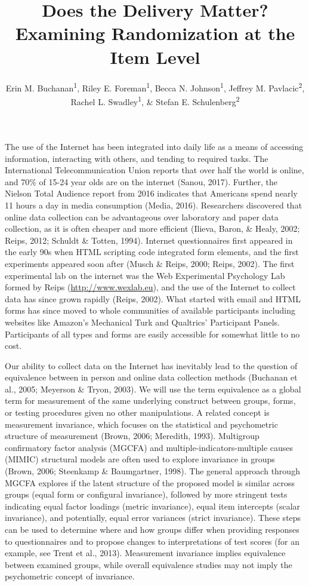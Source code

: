 \documentclass[english,man, mask]{apa6}
\title{Does the Delivery Matter? Examining Randomization at the Item Level}
\author{Erin M. Buchanan\textsuperscript{1}, Riley E. Foreman\textsuperscript{1}, Becca N. Johnson\textsuperscript{1}, Jeffrey M. Pavlacic\textsuperscript{2}, Rachel L. Swadley\textsuperscript{1}, \& Stefan E. Schulenberg\textsuperscript{2}}
\affiliation{
    \vspace{0.5cm}
          \textsuperscript{1} Missouri State University\\
          \textsuperscript{2} University of Mississippi  }
\theoremstyle{definition}
\theoremstyle{definition}
\theoremstyle{definition}
\theoremstyle{remark}
\begin{document}
\maketitle

\setcounter{secnumdepth}{0}



The use of the Internet has been integrated into daily life as a means
of accessing information, interacting with others, and tending to
required tasks. The International Telecommunication Union reports that
over half the world is online, and 70\% of 15-24 year olds are on the
internet (Sanou, 2017). Further, the Nielson Total Audience report from
2016 indicates that Americans spend nearly 11 hours a day in media
consumption (Media, 2016). Researchers discovered that online data
collection can be advantageous over laboratory and paper data
collection, as it is often cheaper and more efficient (Ilieva, Baron, \&
Healy, 2002; Reips, 2012; Schuldt \& Totten, 1994). Internet
questionnaires first appeared in the early 90s when HTML scripting code
integrated form elements, and the first experiments appeared soon after
(Musch \& Reips, 2000; Reips, 2002). The first experimental lab on the
internet was the Web Experimental Psychology Lab formed by Reips
(\url{http://www.wexlab.eu}), and the use of the Internet to collect
data has since grown rapidly (Reips, 2002). What started with email and
HTML forms has since moved to whole communities of available
participants including websites like Amazon's Mechanical Turk and
Qualtrics' Participant Panels. Participants of all types and forms are
easily accessible for somewhat little to no cost.

Our ability to collect data on the Internet has inevitably lead to the
question of equivalence between in person and online data collection
methods (Buchanan et al., 2005; Meyerson \& Tryon, 2003). We will use
the term equivalence as a global term for measurement of the same
underlying construct between groups, forms, or testing procedures given
no other manipulations. A related concept is measurement invariance,
which focuses on the statistical and psychometric structure of
measurement (Brown, 2006; Meredith, 1993). Multigroup confirmatory
factor analysis (MGCFA) and multiple-indicators-multiple causes (MIMIC)
structural models are often used to explore invariance in groups (Brown,
2006; Steenkamp \& Baumgartner, 1998). The general approach through
MGCFA explores if the latent structure of the proposed model is similar
across groups (equal form or configural invariance), followed by more
stringent tests indicating equal factor loadings (metric invariance),
equal item intercepts (scalar invariance), and potentially, equal error
variances (strict invariance). These steps can be used to determine
where and how groups differ when providing responses to questionnaires
and to propose changes to interpretations of test scores (for an
example, see Trent et al., 2013). Measurement invariance implies
equivalence between examined groups, while overall equivalence studies
may not imply the psychometric concept of invariance.
\end{document}

